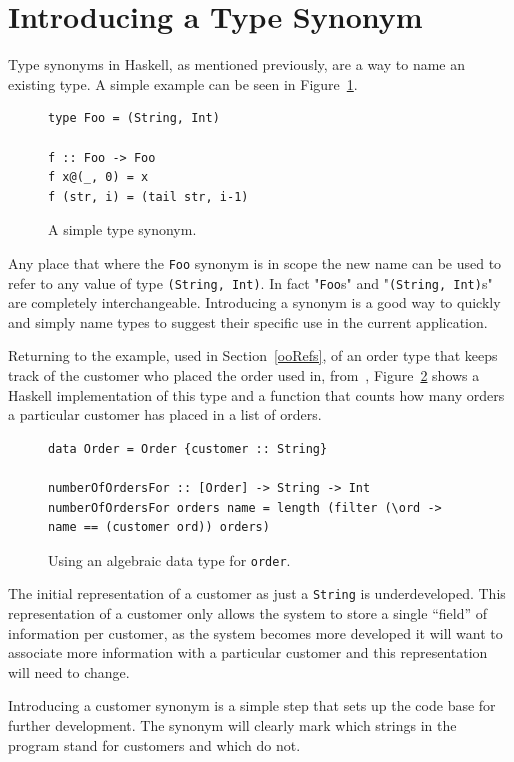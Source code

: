 \section{Introducing a Type Synonym}\label{introSyn}

Type synonyms in Haskell, as mentioned previously, are a way to name an existing type. A simple example can be seen in Figure~\ref{fooSyn}. 

\begin{figure}[t]
	\begin{lstlisting}
type Foo = (String, Int)

f :: Foo -> Foo
f x@(_, 0) = x
f (str, i) = (tail str, i-1) 
	\end{lstlisting}
	\caption{A simple type synonym.}\label{fooSyn}
\end{figure}

Any place that where the \texttt{Foo} synonym is in scope the new name can be used to refer to any value of type \texttt{(String, Int)}. In fact "\texttt{Foo}s" and "\texttt{(String, Int)}s" are completely interchangeable. Introducing a synonym is a good way to quickly and simply name types to suggest their specific use in the current application.

Returning to the example, used in Section~\ref{ooRefs}, of an order type that keeps track of the customer who placed the order used in, from~\cite{fowler}, Figure~\ref{haskellOrder} shows a Haskell implementation of this type and a function that counts how many orders a particular customer has placed in a list of orders.

\begin{figure}
	\begin{lstlisting}
data Order = Order {customer :: String}

numberOfOrdersFor :: [Order] -> String -> Int
numberOfOrdersFor orders name = length (filter (\ord -> name == (customer ord)) orders)
	\end{lstlisting}
	\caption{Using an algebraic data type for \texttt{order}.}
	\label{haskellOrder}
\end{figure}

The initial representation of a customer as just a \texttt{String} is underdeveloped. This representation of a customer only allows the system to store a single ``field'' of information per customer, as the system becomes more developed it will want to associate more information with a particular customer and this representation will need to change.

 Introducing a customer synonym is a simple step that sets up the code base for further development. The synonym will clearly mark which strings in the program stand for customers and which do not.

